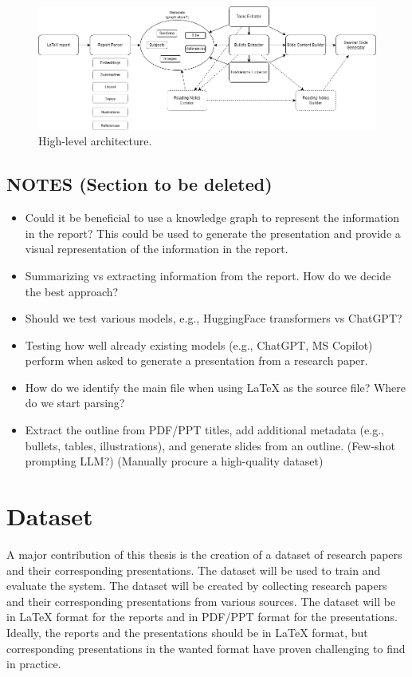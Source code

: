 \begin{figure}
    \centering
    \includegraphics[width=1\linewidth]{images/High-Level Architecture Diagram.png}
    \caption{High-level architecture.}
    \label{fig:high-level-architecture}
\end{figure}

%
\subsection{NOTES (Section to be deleted)}
\begin{itemize}
    \item Could it be beneficial to use a knowledge graph to represent the information in the report? This could be used to generate the presentation and provide a visual representation of the information in the report.
    \item Summarizing vs extracting information from the report. How do we decide the best approach?
    \item Should we test various models, e.g., HuggingFace transformers vs ChatGPT?
    \item Testing how well already existing models (e.g., ChatGPT, MS Copilot) perform when asked to generate a presentation from a research paper.
    \item How do we identify the main file when using LaTeX as the source file? Where do we start parsing? 
    \item Extract the outline from PDF/PPT titles, add additional metadata (e.g., bullets, tables, illustrations), and generate slides from an outline. (Few-shot prompting LLM?) (Manually procure a high-quality dataset)
\end{itemize}

\section{Dataset}

A major contribution of this thesis is the creation of a dataset of research papers and their corresponding presentations. The dataset will be used to train and evaluate the system. The dataset will be created by collecting research papers and their corresponding presentations from various sources. The dataset will be in \LaTeX{} format for the reports and in PDF/PPT format for the presentations. Ideally, the reports and the presentations should be in LaTeX format, but corresponding presentations in the wanted format have proven challenging to find in practice. 

